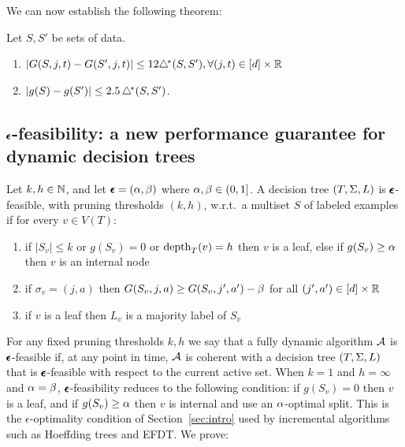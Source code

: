We can now establish the following theorem:

\begin{theorem}
\label{th:smoothness}
Let $S,S'$ be sets of data.
\begin{enumerate}%
    \item $|G(S,j,t) - G(S',j,t)| \le 12 \triangle^{\!*}(S,S'), \forall (j,t) \in [d] \times \mathbb{R}$
    \item $|g(S)-g(S')| \le 2.5 \, \triangle^{\!*}(S,S')$.
\end{enumerate}
\end{theorem}

\subsection{$\pmb{\epsilon}$-feasibility: a new performance guarantee for dynamic decision trees}
\begin{definition}\label{def:eps_feasibility}
Let $k,h \in \mathbb{N}$, and let $\pmb{\epsilon}=(\alpha,\beta)$ where $\alpha,\beta \in (0, 1]$. A decision tree $(T,\Sigma,L)$ is $\pmb{\epsilon}$-feasible, with pruning thresholds $(k,h)$, w.r.t.\ a multiset $S$ of labeled examples if for every $v \in V(T)$:
\begin{enumerate}
\item if $|S_v| \le k$ or $g(S_v) = 0$ or $\operatorname{depth}_T(v)=h$ then $v$ is a leaf, else if $g(S_v) \ge \alpha$ then $v$ is an internal node
\item if $\sigma_v = (j,a)$ then $G(S_v,j,a) \geq G(S_v,j',a') - \beta$ for all $(j',a') \in [d] \times \mathbb{R}$
\item if $v$ is a leaf then $L_v$ is a majority label of $S_v$
\end{enumerate}
\end{definition}
For any fixed pruning thresholds $k,h$ we say that a fully dynamic algorithm $\mathcal{A}$ is $\pmb{\epsilon}$-feasible if, at any point in time, $\mathcal{A}$ is coherent with a decision tree $(T,\Sigma,L)$ that is $\pmb{\epsilon}$-feasible with respect to the current active set. 
When $k=1$ and $h=\infty$ and $\alpha=\beta$, $\pmb{\epsilon}$-feasibility reduces to the following condition: if $g(S_v)=0$ then $v$ is a leaf, and if $g(S_v) \ge \alpha$ then $v$ is internal and use an $\alpha$-optimal split. This is the $\epsilon$-optimality condition of Section~\ref{sec:intro} used by incremental algorithms such as Hoeffding trees and EFDT.
We prove:

